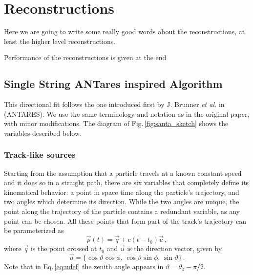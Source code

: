 \documentclass[../Main.tex]{subfiles}
\begin{document}
       {}       {}
    {}    {}
 {} {}


\graphicspath{{figures/}{Reconstructions/figures/}}


\section{Reconstructions}\label{sec:Reconstructions}

Here we are going to write some really good words about the
reconstructions, at least the higher level reconstructions.

Performance of the reconstructions is given at the end

\subsection{Single String ANTares inspired Algorithm}\label{sec:SANTA}
This directional fit follows the one introduced first by J. Brunner \textit{et al.} in \cite{bbfit} (ANTARES). We use the same terminology and notation as in the original paper, with minor modifications. The diagram of Fig.\,\ref{fig:santa_sketch} shows the variables described below.

\subsubsection{Track-like sources}
Starting from the assumption that a particle travels at a known constant speed and it does so in a straight path, there are six variables that completely define its kinematical behavior: a point in space time along the particle's trajectory, and two angles which determine its direction. While the two angles are unique, the point along the trajectory of the particle contains a redundant variable, as any point can be chosen. All these points that form part of the track's trajectory can be parameterized as
\begin{equation}
\vec{p}(t) = \vec{q} + c\left( t-t_0 \right) \vec{u}\,,
\end{equation}
where $\vec{q}$ is the point crossed at $t_0$ and $\vec{u}$ is the direction vector, given by
\begin{equation}
  \vec{u} = \{ \cos\vartheta \cos\phi, \, \cos\vartheta\sin\phi,\, \sin\vartheta \}\,.
  \label{eq:udef}
\end{equation}
Note that in Eq.\,\ref{eq:udef} the zenith angle appears in $\vartheta = \theta_z - \pi/2$.
\end{document}
